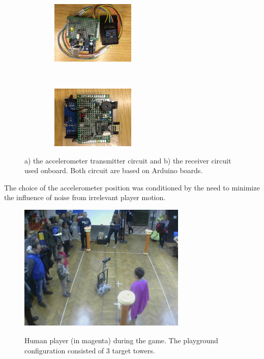 \begin{figure}[H]
      \centering
      \begin{subfigure}[t]{0.5\textwidth}
      	\centering
	    \includegraphics[width=5cm,height=3cm]{images/04-activity/sender.jpg}
	    \caption{}
	  \end{subfigure}
	  ~
	  \begin{subfigure}[t]{0.5\textwidth}
      	\centering
	    \includegraphics[width=5cm,height=3cm]{images/04-activity/receiver.jpg}
	    \caption{}
	  \end{subfigure}
      \caption{a) the accelerometer transmitter circuit and b) the receiver circuit used onboard. Both circuit are based on Arduino boards.}\label{fig:the_accelerometer}
\end{figure}

The choice of the accelerometer position was conditioned by the need to minimize the influence of noise from irrelevant player motion.

\begin{figure}[thpb]
      \centering
      {\includegraphics[width=8cm]{images/04-activity/event.jpg}}
      \caption{Human player (in magenta) during the game. The playground configuration consisted of 3 target towers.}
      \label{game}
\end{figure}

